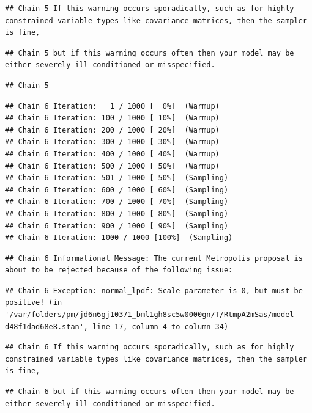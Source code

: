 \documentclass[
]{book}
\begin{document}
\begin{verbatim}
## Chain 5 If this warning occurs sporadically, such as for highly constrained variable types like covariance matrices, then the sampler is fine,
\end{verbatim}

\begin{verbatim}
## Chain 5 but if this warning occurs often then your model may be either severely ill-conditioned or misspecified.
\end{verbatim}

\begin{verbatim}
## Chain 5
\end{verbatim}

\begin{verbatim}
## Chain 6 Iteration:   1 / 1000 [  0%]  (Warmup) 
## Chain 6 Iteration: 100 / 1000 [ 10%]  (Warmup) 
## Chain 6 Iteration: 200 / 1000 [ 20%]  (Warmup) 
## Chain 6 Iteration: 300 / 1000 [ 30%]  (Warmup) 
## Chain 6 Iteration: 400 / 1000 [ 40%]  (Warmup) 
## Chain 6 Iteration: 500 / 1000 [ 50%]  (Warmup) 
## Chain 6 Iteration: 501 / 1000 [ 50%]  (Sampling) 
## Chain 6 Iteration: 600 / 1000 [ 60%]  (Sampling) 
## Chain 6 Iteration: 700 / 1000 [ 70%]  (Sampling) 
## Chain 6 Iteration: 800 / 1000 [ 80%]  (Sampling) 
## Chain 6 Iteration: 900 / 1000 [ 90%]  (Sampling) 
## Chain 6 Iteration: 1000 / 1000 [100%]  (Sampling)
\end{verbatim}

\begin{verbatim}
## Chain 6 Informational Message: The current Metropolis proposal is about to be rejected because of the following issue:
\end{verbatim}

\begin{verbatim}
## Chain 6 Exception: normal_lpdf: Scale parameter is 0, but must be positive! (in '/var/folders/pm/jd6n6gj10371_bml1gh8sc5w0000gn/T/RtmpA2mSas/model-d48f1dad68e8.stan', line 17, column 4 to column 34)
\end{verbatim}

\begin{verbatim}
## Chain 6 If this warning occurs sporadically, such as for highly constrained variable types like covariance matrices, then the sampler is fine,
\end{verbatim}

\begin{verbatim}
## Chain 6 but if this warning occurs often then your model may be either severely ill-conditioned or misspecified.
\end{verbatim}
\end{document}

